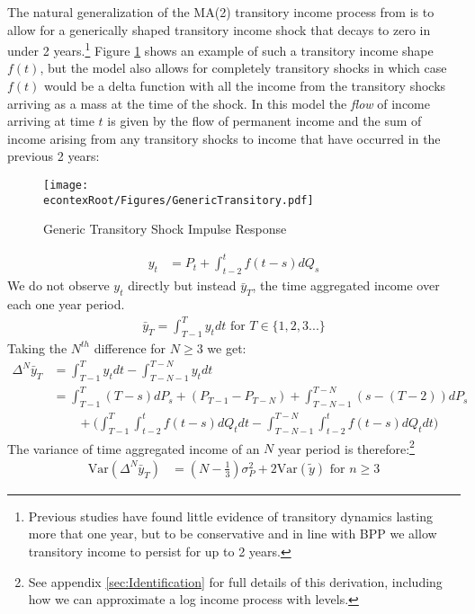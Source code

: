 \documentclass[titlepage]{\econtex}\newcommand{\texname}{ConsumptionHeterogeneity}
\begin{document}
The natural generalization of the MA(2) transitory income process from \cite{carroll_nature_1997} is to allow for a generically shaped transitory income shock that decays to zero in under 2 years.\footnote{Previous studies have found little evidence of transitory dynamics lasting more that one year, but to be conservative and in line with BPP we allow transitory income to persist for up to 2 years.} Figure \ref{fig:GenericTransitory} shows an example of such a transitory income shape $f(t)$, but the model also allows for completely transitory shocks in which case $f(t)$ would be a delta function with all the income from the transitory shocks arriving as a mass at the time of the shock. In this model the \textit{flow} of income arriving at time $t$ is given by the flow of permanent income and the sum of income arising from any transitory shocks to income that have occurred in the previous 2 years:
\begin{figure} 
	\begin{centering}
		\texttt{[image: \\econtexRoot/Figures/GenericTransitory.pdf]} 
		\caption{Generic Transitory Shock Impulse Response}
		\label{fig:GenericTransitory}
	\end{centering}
\end{figure}
\begin{align*}
y_t &= P_t + \int_{t-2}^{t} f(t-s)dQ_s
\end{align*}
We do not observe $y_t$ directly but instead $\bar{y}_T$, the time aggregated income over each one year period.
\begin{align}
\bar{y}_T = \int_{T-1}^{T} y_t dt \text{   for } T \in \{1,2,3...\}\label{income_TA}
\end{align}
Taking the $N^{th}$ difference for $N \geq 3$ we get:
\begin{align}
\Delta^N \bar{y}_T &= \int_{T-1}^{T} y_t dt  - \int_{T-N-1}^{T-N} y_t dt  \nonumber \\ 
&= \int_{T-1}^{T} (T-s)dP_s  + (P_{T-1} - P_{T-N}) + \int_{T-N-1}^{T-N} (s-(T-2))dP_s \nonumber \\
& \qquad + \Big(\int_{T-1}^{T} \int_{t-2}^{t} f(t-s)dQ_t dt -\int_{T-N-1}^{T-N}\int_{t-2}^{t} f(t-s) dQ_t dt \Big) \label{deltaNy}
\end{align}
The variance of time aggregated income of an $N$ year period is therefore:\footnote{See appendix \ref{sec:Identification} for full details of this derivation, including how we can approximate a log income process  with levels.}
\begin{align}
\mathrm{Var}(\Delta^N \bar{y}_T) &= (N-\frac{1}{3})\sigma^2_P +  2 \mathrm{Var}(\tilde{y}) \text{   for }n \geq 3 \label{variance}
\end{align}
\end{document}
